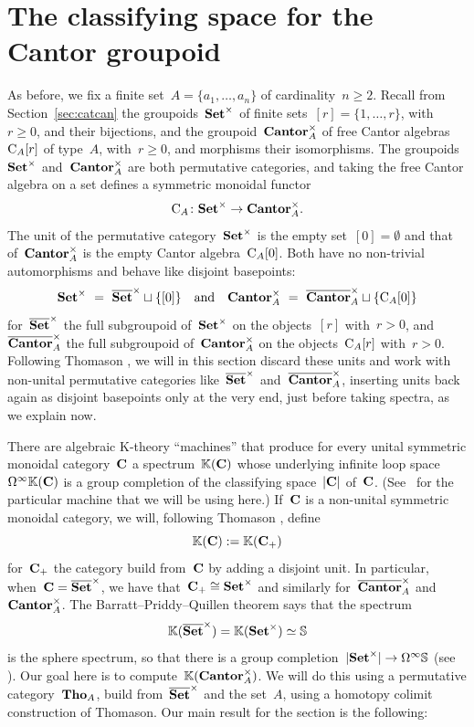 
\section{The classifying space for the Cantor groupoid}\label{sec:classifying}

As before, we fix a finite set~$A=\{a_1,\dots,a_n\}$ of cardinality~$n\ge 2$. 
Recall from Section~\ref{sec:catcan} the groupoids~$\mathbf{Set}^\times$  of finite sets~$[r]=\{1,\dots,r\}$, with~$r\ge 0$, and their bijections,  and the groupoid~$\mathbf{Cantor}_A^\times$  of free Cantor algebras~$\mathrm{C}_A[r]$ of type~$A$, with~$r\ge 0$, and morphisms their isomorphisms. The groupoids~$\mathbf{Set}^\times$ and~$\mathbf{Cantor}_A^\times$ are both permutative categories, and taking the free Cantor algebra on a set defines a symmetric monoidal functor
\[
\mathrm{C}_A\colon\mathbf{Set}^\times\to \mathbf{Cantor}_A^\times.
\]
The unit of the permutative category~$\mathbf{Set}^\times$ is the empty set~$[0]=\emptyset$ and that of~$\mathbf{Cantor}_A^\times$ is the empty Cantor algebra~$\mathrm{C}_A[0]$. Both have no non-trivial automorphisms and behave like disjoint basepoints:
\[
\Set^\x\ = \ \bSet^\x \sqcup \{[0]\} \ \ \ \textrm{and}\ \ \ \Can_A^\x\ =\ \bCan_A^\x\sqcup \{\rmC_A[0]\}
\]
for~$\overline{\mathbf{Set}}^\times$ the full subgroupoid of~$\mathbf{Set}^\times$ on the objects~$[r]$ with~$r>0$, and~$\overline{\mathbf{Cantor}}_A^\times$ the full subgroupoid of~$\mathbf{Cantor}_A^\times$ on the objects~$\mathrm{C}_A[r]$ with~$r>0$. 
Following Thomason \cite{Thomason}, we will in this section discard these units and work with non-unital permutative categories like~$\overline{\mathbf{Set}}^\times$ and~$\overline{\mathbf{Cantor}}^\times_A$,  
inserting units back again as disjoint basepoints only at the very end, just before taking spectra, as we explain now. 

There are algebraic K-theory ``machines'' that produce for every unital symmetric monoidal category~$\mathbf{C}$ a spectrum~$\mathbb{K}(\mathbf{C})$ whose underlying infinite loop space
$\Omega^\infty\mathbb{K}(\mathbf{C})$
is a group completion of the classifying space~$|\mathbf{C}|$ of~$\mathbf{C}$. (See~\cite[App C]{Thomason} for the particular machine that we will be using here.) 
If~$\mathbf{C}$ is a non-unital symmetric monoidal category, we will, following Thomason \cite[App C]{Thomason}, define 
$$\mathbb{K}(\mathbf{C}):=\mathbb{K}(\mathbf{C}_+)$$
for~$\mathbf{C}_+$ the category build from~$\mathbf{C}$ by adding a disjoint unit. In particular, when~$\mathbf{C}=\overline{\mathbf{Set}}^\times$, we have that~\hbox{$\mathbf{C}_+\cong \mathbf{Set}^\times$} and similarly for~$\overline{\mathbf{Cantor}}_A^\times$ and~$\mathbf{Cantor}_A^\times$. The Barratt--Priddy--Quillen theorem says that the spectrum
\[
\mathbb{K}(\overline{\mathbf{Set}}^\times)=\mathbb{K}(\mathbf{Set}^\times)\simeq \mathbb{S}
\]
is the sphere spectrum, so that there is a group completion~$|\mathbf{Set}^\times|\to\Omega^\infty\mathbb{S}$ (see \cite{BP72}). Our goal here is to compute~$\mathbb{K}(\mathbf{Cantor}_A^\times)$. We will do this using a permutative category~$\mathbf{Tho}_A$, build 
from~$\overline{\mathbf{Set}}^\times$ and the set~$A$, using a homotopy colimit construction of Thomason. Our main result for the section is the following: 


